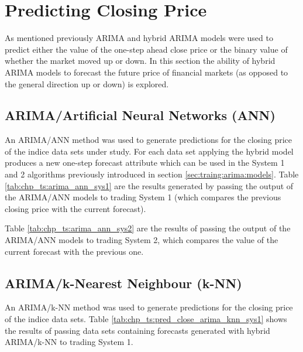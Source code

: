 \section{Predicting Closing Price}
As mentioned previously ARIMA and hybrid ARIMA models were used to predict either the value of the one-step ahead close price or the binary value of whether the market moved up or down. In this section the ability of hybrid ARIMA models to forecast the future price of financial markets (as opposed to the general direction up or down) is explored.

\subsection{ARIMA/Artificial Neural Networks (ANN)}
An ARIMA/ANN method was used to generate predictions for the closing price of the indice data sets under study. For each data set applying the hybrid model produces a new one-step forecast attribute which can be used in the System 1 and 2 algorithms previously introduced in section \ref{sec:traing:arima:models}. Table \ref{tab:chp_ts:arima_ann_sys1} are the results generated by passing the output of the ARIMA/ANN models to trading System 1 (which compares the previous closing price with the current forecast).

\label{todo:chp5:tab:chp_ts:arima_hybrid_reg}



Table \ref{tab:chp_ts:arima_ann_sys2} are the results of passing the output of the ARIMA/ANN models to trading System 2, which compares the value of the current forecast with the previous one.



\subsection{ARIMA/k-Nearest Neighbour (k-NN)}
An ARIMA/k-NN method was used to generate predictions for the closing price of the indice data sets. Table \ref{tab:chp_ts:pred_close_arima_knn_sys1} shows the results of passing data sets containing forecasts generated with hybrid ARIMA/k-NN to trading System 1.




